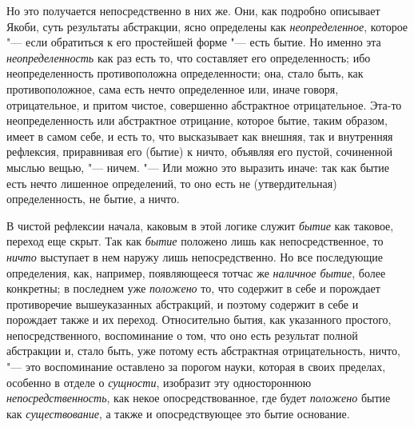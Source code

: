 Но это получается непосредственно в них же. Они, как подробно описывает
Якоби, суть результаты абстракции, ясно определены как
{\em неопределенное}, которое "--- если обратиться к его
простейшей форме "--- есть бытие. Но именно эта
{\em неопределенность} как раз есть то, что составляет
его определенность; ибо неопределенность противоположна определенности;
она, стало быть, как противоположное, сама есть нечто определенное или,
иначе говоря, отрицательное, и притом чистое, совершенно абстрактное
отрицательное. Эта-то неопределенность или абстрактное отрицание, которое
бытие, таким образом, имеет в самом себе, и есть то, что высказывает как
внешняя, так и внутренняя рефлексия, приравнивая его (бытие) к ничто,
объявляя его пустой, сочиненной мыслью вещью, "--- ничем. "--- Или можно это
выразить иначе: так как бытие есть нечто лишенное определений, то оно есть
не (утвердительная) определенность, не бытие, а ничто.

В чистой рефлексии начала, каковым в этой логике служит
{\em бытие} как таковое, переход еще скрыт. Так как
{\em бытие} положено лишь как непосредственное, то
{\em ничто} выступает в нем наружу лишь
непосредственно. Но все последующие определения, как, например,
появляющееся тотчас же {\em наличное бытие}, более
конкретны; в последнем уже {\em положено} то, что
содержит в себе и порождает противоречие вышеуказанных абстракций, и
поэтому содержит в себе и порождает также и их переход. Относительно бытия,
как указанного простого, непосредственного, воспоминание о том, что оно
есть результат полной абстракции и, стало быть, уже потому есть абстрактная
отрицательность, ничто, "--- это воспоминание оставлено за порогом науки,
которая в своих пределах, особенно в отделе о
{\em сущности}, изобразит эту одностороннюю
{\em непосредственность}, как некое опосредствованное,
где будет {\em положено} бытие как
{\em существование}, а также и опосредствующее это
бытие основание.

